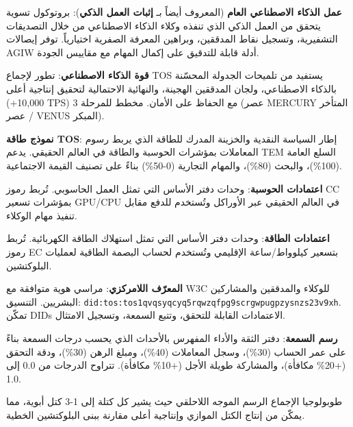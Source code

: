 \documentclass[11pt]{article}
\begin{document}
\begin{description}[leftmargin=3cm, style=nextline]
  \item[AGIW (PoIW)] \textbf{عمل الذكاء الاصطناعي العام} (المعروف أيضاً بـ \textbf{إثبات العمل الذكي}): بروتوكول تسوية يتحقق من العمل الذكي الذي تنفذه وكلاء الذكاء الاصطناعي من خلال التصديقات التشفيرية، وتسجيل نقاط المدققين، وبراهين المعرفة الصفرية اختيارياً. توفر إيصالات AGIW أدلة قابلة للتدقيق على إكمال المهام مع مقاييس الجودة.

  \item[PAI] \textbf{قوة الذكاء الاصطناعي}: تطور لإجماع TOS يستفيد من تلميحات الجدولة المحسّنة بالذكاء الاصطناعي، ولجان المدققين الهجينة، والنهائية الاحتمالية لتحقيق إنتاجية أعلى (+10,000 TPS) مع الحفاظ على الأمان. مخطط للمرحلة 3 (عصر MERCURY المتأخر / عصر VENUS المبكر).

  \item[TEM] \textbf{نموذج طاقة TOS}: إطار السياسة النقدية والخزينة المدرك للطاقة الذي يربط رسوم المعاملات بمؤشرات الحوسبة والطاقة في العالم الحقيقي. يدعم TEM السلع العامة (100\%)، والبحث (80\%)، والمهام التجارية (0-50\%) بناءً على تصنيف القيمة الاجتماعية.

  \item[CC] \textbf{اعتمادات الحوسبة}: وحدات دفتر الأساس التي تمثل العمل الحاسوبي. تُربط رموز CC بمؤشرات تسعير GPU/CPU في العالم الحقيقي عبر الأوراكل وتُستخدم للدفع مقابل تنفيذ مهام الوكلاء.

  \item[EC] \textbf{اعتمادات الطاقة}: وحدات دفتر الأساس التي تمثل استهلاك الطاقة الكهربائية. تُربط رموز EC بتسعير كيلوواط/ساعة الإقليمي وتُستخدم لحساب البصمة الطاقية لعمليات البلوكتشين.

  \item[DID] \textbf{المعرّف اللامركزي}: مراسي هوية متوافقة مع W3C للوكلاء والمدققين والمشاركين البشريين. التنسيق: \texttt{did:tos:tos1qvqsyqcyq5rqwzqfpg9scrgwpugpzysnzs23v9xh}. تمكّن DIDs الاعتمادات القابلة للتحقق، وتتبع السمعة، وتسجيل الامتثال.

  \item[RepGraph] \textbf{رسم السمعة}: دفتر الثقة والأداء المفهرس بالأحداث الذي يحسب درجات السمعة بناءً على عمر الحساب (30\%)، وسجل المعاملات (40\%)، ومبلغ الرهن (30\%)، ودقة التحقق (+20\% مكافأة)، والمشاركة طويلة الأجل (+10\% مكافأة). تتراوح الدرجات من 0.0 إلى 1.0.

  \item[BlockDAG] طوبولوجيا الإجماع الرسم الموجه اللاحلقي حيث يشير كل كتلة إلى 1-3 كتل أبوية، مما يمكّن من إنتاج الكتل الموازي وإنتاجية أعلى مقارنة ببنى البلوكتشين الخطية.


\end{description}
\end{document}
